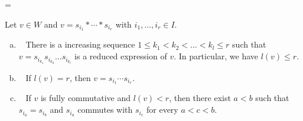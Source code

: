 \documentclass[ALCO,ThmDefs,Unicode,epreuves]{cedram}
\begin{document}
\setbox\toto=\hbox{\cite[Lemma~3.1 and Proposition~3.4]{GK}}
\begin{lemm}[\box\toto]
\label{lem:red}
Let $v \in W$ and $v = s_{i_1} * \cdots * s_{i_r}$ with $i_1, \dots, i_r \in I$.
\begin{enumerate}[(a)]
\item~\label{lemma3.12_a} %
There is a increasing sequence $1 \le k_1 < k_2 < \dots < k_l \le r$ such that 
$v = s_{i_{k_1}} s_{i_{k_2}} \dots s_{i_{k_l}}$ is a reduced expression of $v$.
In particular, we have $l(v) \le r$.
\item~\label{lemma3.12_b} %
If $l(v) = r$, then $v = s_{i_1} \cdots s_{i_r}$.
\item~\label{lemma3.12_c} %
If $v$ is fully commutative and $l(v) < r$, 
then there exist $a < b$ such that $s_{i_a} = s_{i_b}$ and
$s_{i_a}$ commutes with $s_{i_c}$ for every $a < c < b$.
\end{enumerate}
\end{lemm}
\end{document}

